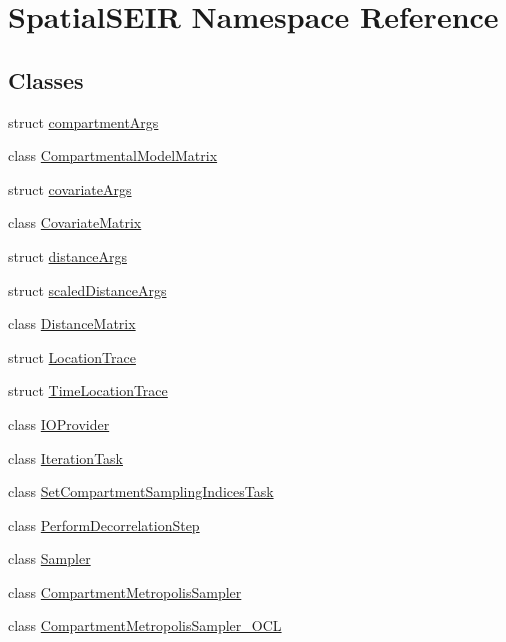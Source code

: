 \hypertarget{namespaceSpatialSEIR}{\section{Spatial\-S\-E\-I\-R Namespace Reference}
\label{namespaceSpatialSEIR}
}
\subsection*{Classes}
\begin{DoxyCompactItemize}
\item 
struct \hyperlink{structSpatialSEIR_1_1compartmentArgs}{compartment\-Args}
\item 
class \hyperlink{classSpatialSEIR_1_1CompartmentalModelMatrix}{Compartmental\-Model\-Matrix}
\item 
struct \hyperlink{structSpatialSEIR_1_1covariateArgs}{covariate\-Args}
\item 
class \hyperlink{classSpatialSEIR_1_1CovariateMatrix}{Covariate\-Matrix}
\item 
struct \hyperlink{structSpatialSEIR_1_1distanceArgs}{distance\-Args}
\item 
struct \hyperlink{structSpatialSEIR_1_1scaledDistanceArgs}{scaled\-Distance\-Args}
\item 
class \hyperlink{classSpatialSEIR_1_1DistanceMatrix}{Distance\-Matrix}
\item 
struct \hyperlink{structSpatialSEIR_1_1LocationTrace}{Location\-Trace}
\item 
struct \hyperlink{structSpatialSEIR_1_1TimeLocationTrace}{Time\-Location\-Trace}
\item 
class \hyperlink{classSpatialSEIR_1_1IOProvider}{I\-O\-Provider}
\item 
class \hyperlink{classSpatialSEIR_1_1IterationTask}{Iteration\-Task}
\item 
class \hyperlink{classSpatialSEIR_1_1SetCompartmentSamplingIndicesTask}{Set\-Compartment\-Sampling\-Indices\-Task}
\item 
class \hyperlink{classSpatialSEIR_1_1PerformDecorrelationStep}{Perform\-Decorrelation\-Step}
\item 
class \hyperlink{classSpatialSEIR_1_1Sampler}{Sampler}
\item 
class \hyperlink{classSpatialSEIR_1_1CompartmentMetropolisSampler}{Compartment\-Metropolis\-Sampler}
\item 
class \hyperlink{classSpatialSEIR_1_1CompartmentMetropolisSampler__OCL}{Compartment\-Metropolis\-Sampler\-\_\-\-O\-C\-L}

\end{DoxyCompactItemize}
